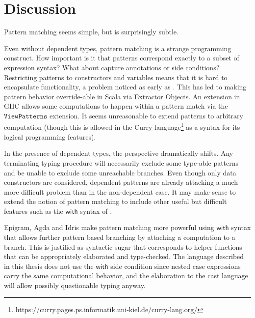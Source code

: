 \section{Discussion}



Pattern matching seems simple, but is surprisingly subtle.

Even without dependent types, pattern matching is a strange programming construct. 
How important is it that patterns correspond exactly to a subset of expression syntax?
What about capture annotations or side conditions?
Restricting patterns to constructors and variables means that it is hard to encapsulate functionality, a problem noticed as early as \cite{10.1145/41625.41653}. 
This has led to making pattern behavior override-able in Scala via Extractor Objects.
An extension in GHC allows some computations to happen within a pattern match via the $\mathtt{ViewPatterns}$ extension.
It seems unreasonable to extend patterns to arbitrary computation (though this is allowed in the Curry language\footnote{https://curry.pages.ps.informatik.uni-kiel.de/curry-lang.org/} as a syntax for its logical programming features). 

In the presence of \fullSp{} dependent types, the perspective dramatically shifts.
Any terminating typing procedure will necessarily exclude some type-able patterns and be unable to exclude some unreachable branches.
Even though only data constructors are considered, dependent patterns are already attacking a much more difficult problem than in the non-dependent case.
It may make sense to extend the notion of pattern matching to include other useful but difficult features such as the $\mathsf{with}$ syntax of \cite{mcbride_mckinna_2004}.


Epigram, Agda and Idris make pattern matching more powerful using $\mathsf{with}$ syntax that allows further pattern based branching by attaching a computation to a branch.
This is justified as syntactic sugar that corresponds to helper functions that can be appropriately elaborated and type-checked.
The language described in this thesis does not use the $\mathsf{with}$ side condition since nested case expressions carry the same computational behavior, and the elaboration to the cast language will allow possibly questionable typing anyway.

